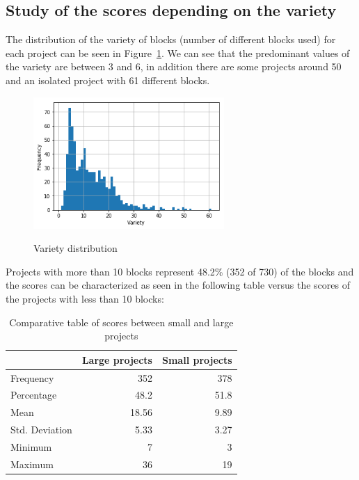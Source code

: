 \documentclass[a4paper]{article}
\begin{document}
\subsection{Study of the scores depending on the variety}

The distribution of the variety of blocks (number of different blocks used) for each project can be seen in Figure~\ref{fig:var-dist}. We can see that the predominant values of the variety are between 3 and 6, in addition there are some projects around 50 and an isolated project with 61 different blocks.

\begin{figure}[ht]
\begin{center}
\includegraphics[height=5cm]{fig1}
\caption{Variety distribution }
\label{fig:var-dist}
\end{center}
\end{figure}

Projects with more than 10 blocks represent 48.2\% (352 of 730) of the blocks and the scores can be characterized as seen in the following table versus the scores of the projects with less than 10 blocks:

\begin{table}[ht]
\begin{center}
\caption{Comparative table of scores between small and large projects}

\bigskip

\begin{tabular}{|l|r|r|}
\hline
& Large projects & Small projects \\ \hline
Frequency & 352 & 378\\ \hline
Percentage & 48.2 & 51.8\\ \hline
Mean & 18.56 & 9.89\\ \hline
Std. Deviation & 5.33 & 3.27\\ \hline
Minimum & 7 & 3\\ \hline
Maximum & 36 & 19\\ \hline
\end{tabular}
\end{center}
\end{table}
\end{document}
